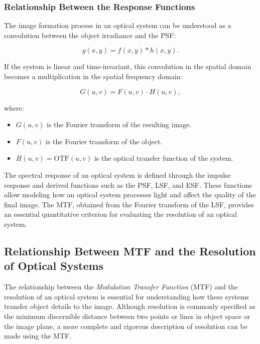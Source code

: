 \subsubsection{Relationship Between the Response Functions}

The image formation process in an optical system can be understood as a convolution between the object irradiance and the PSF:

\begin{equation}
g(x,y) = f(x,y) * h(x,y).
\end{equation}

If the system is linear and time-invariant, this convolution in the spatial domain becomes a multiplication in the spatial frequency domain:

\begin{equation}
G(u,v) = F(u,v) \cdot H(u,v),
\end{equation}

where:
\begin{itemize}
    \item $G(u,v)$ is the Fourier transform of the resulting image.
    \item $F(u,v)$ is the Fourier transform of the object.
    \item $H(u,v) = \text{OTF}(u,v)$ is the optical transfer function of the system.
\end{itemize}

The spectral response of an optical system is defined through the impulse response and derived functions such as the PSF, LSF, and ESF. These functions allow modeling how an optical system processes light and affect the quality of the final image. The MTF, obtained from the Fourier transform of the LSF, provides an essential quantitative criterion for evaluating the resolution of an optical system.

\subsection{Relationship Between MTF and the Resolution of Optical Systems}

The relationship between the \textit{Modulation Transfer Function} (MTF) and the resolution of an optical system is essential for understanding how these systems transfer object details to the image. Although resolution is commonly specified as the minimum discernible distance between two points or lines in object space or the image plane, a more complete and rigorous description of resolution can be made using the MTF.

